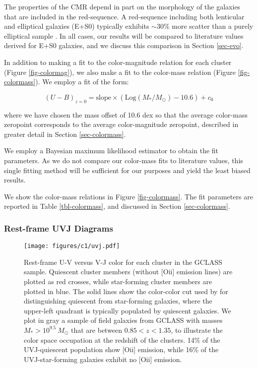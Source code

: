 The properties of the CMR depend in part on the morphology of the galaxies that are included in the red-sequence. A red-sequence including both lenticular and elliptical galaxies (E+S0) typically exhibits $\sim 30\%$ more scatter than a purely elliptical sample  \citep[see e.g.][M09]{Bower:1992mb}. In all cases, our results will be compared to literature values derived for E+S0 galaxies, and we discuss this comparison in Section \ref{sec-evo}.

In addition to making a fit to the color-magnitude relation for each cluster (Figure \ref{fig-colormag}), we also make a fit to the color-mass relation (Figure \ref{fig-colormass}). We employ a fit of the form:

\begin{equation}\label{eq-colormass}
(U-B)_{z=0} = \mathrm{slope} \times (\mathrm{Log}(M_*/M_{\odot})-10.6) + c_0
\end{equation}

where we have chosen the mass offset of 10.6 dex so that the average color-mass zeropoint corresponds to the average color-magnitude zeropoint, described in greater detail in Section \ref{sec-colormass}.

We employ a Bayesian maximum likelihood estimator to obtain the fit parameters. As we do not compare our color-mass fits to literature values, this single fitting method will be sufficient for our purposes and yield the least biased results.

We show the color-mass relations in Figure \ref{fig-colormass}. The fit parameters are reported in Table \ref{tbl-colormass}, and discussed in Section \ref{sec-colormass}.

\subsubsection{Rest-frame UVJ Diagrams}\label{sec-uvj}
\begin{figure*}
\centering \texttt{[image: figures/c1/uvj.pdf]}
\caption[\textit{U-V} versus \textit{V-J} color-color plot for each cluster in the GCLASS sample]{Rest-frame U-V versus V-J color for each cluster in the GCLASS sample. Quiescent cluster members (without [O{\sc ii}] emission lines) are plotted as red crosses, while star-forming cluster members are plotted in blue. The solid lines show the color-color cut used by \citet{Williams:2009tt} for distinguishing quiescent from star-forming galaxies, where the upper-left quadrant is typically populated by quiescent galaxies.
We plot in gray a sample of field galaxies from GCLASS with masses $M_* > 10^{9.5}~M_\odot$ that are between $0.85 < z < 1.35$, to illustrate the color space occupation at the redshift of the clusters.
14\% of the UVJ-quiescent population show [O{\sc ii}] emission, while 16\% of the UVJ-star-forming galaxies exhibit no [O{\sc ii}] emission.
\label{fig-uvj}}
\end{figure*}

